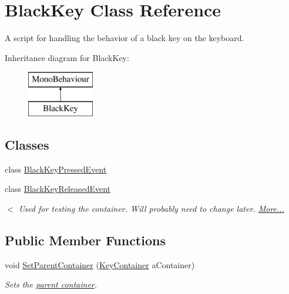 \hypertarget{class_black_key}{}\section{Black\+Key Class Reference}
\label{class_black_key}


A script for handling the behavior of a black key on the keyboard.  


Inheritance diagram for Black\+Key\+:\begin{figure}[H]
\begin{center}
\leavevmode
\includegraphics[height=2.000000cm]{class_black_key}
\end{center}
\end{figure}
\subsection*{Classes}
\begin{DoxyCompactItemize}
\item 
class \hyperlink{group___black_key_event_types_class_black_key_1_1_black_key_pressed_event}{Black\+Key\+Pressed\+Event}
\item 
class \hyperlink{group___black_key_event_types_class_black_key_1_1_black_key_released_event}{Black\+Key\+Released\+Event}
\begin{DoxyCompactList}\small\item\em $<$ Used for testing the container. Will probably need to change later.  \hyperlink{group___black_key_event_types_class_black_key_1_1_black_key_released_event}{More...}\end{DoxyCompactList}\end{DoxyCompactItemize}
\subsection*{Public Member Functions}
\begin{DoxyCompactItemize}
\item 
void \hyperlink{group___black_key_pub_func_ga49d807a46e36ba19211be329db1cbd2e}{Set\+Parent\+Container} (\hyperlink{class_key_container}{Key\+Container} a\+Container)
\begin{DoxyCompactList}\small\item\em Sets the \hyperlink{group___doc_key_contain}{parent container}. \end{DoxyCompactList}\end{DoxyCompactItemize}
